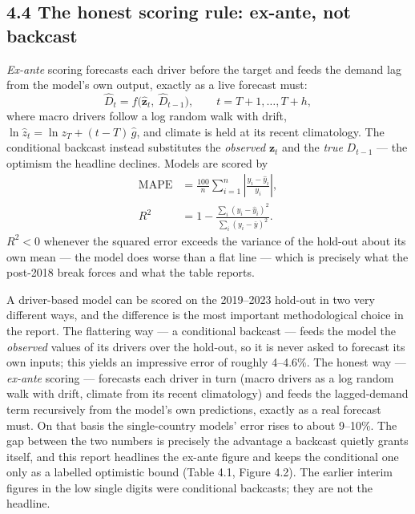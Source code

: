 \documentclass[10pt,twocolumn]{article}
\begin{document}
\subsection*{4.4 The honest scoring rule: ex-ante, not backcast}

\noindent \emph{Ex-ante} scoring forecasts each driver before the target and
feeds the demand lag from the model's own output, exactly as a live forecast
must:
\begin{equation}
\hat D_t=f\!\bigl(\hat{\mathbf{z}}_t,\ \hat D_{t-1}\bigr),\qquad t=T{+}1,\dots,T{+}h,
\label{eq:exante}
\end{equation}
where macro drivers follow a log random walk with drift,
$\ln\hat z_{t}=\ln z_{T}+(t-T)\,\hat g$, and climate is held at its recent
climatology. The conditional backcast instead substitutes the \emph{observed}
$\mathbf{z}_t$ and the \emph{true} $D_{t-1}$ --- the optimism the headline
declines. Models are scored by
\begin{equation}
\begin{aligned}
\mathrm{MAPE}&=\frac{100}{n}\sum_{i=1}^{n}\left|\frac{y_i-\hat y_i}{y_i}\right|,\\
R^{2}&=1-\frac{\sum_i (y_i-\hat y_i)^2}{\sum_i (y_i-\bar y)^2}.
\end{aligned}
\label{eq:scores}
\end{equation}
$R^{2}<0$ whenever the squared error exceeds the variance of the hold-out about
its own mean --- the model does worse than a flat line --- which is precisely
what the post-2018 break forces and what the table reports.

A driver-based model can be scored on the 2019--2023 hold-out in two very different ways, and the difference is the most important methodological choice in the report. The flattering way --- a conditional backcast --- feeds the model the \textit{observed} values of its drivers over the hold-out, so it is never asked to forecast its own inputs; this yields an impressive error of roughly 4--4.6\%. The honest way --- \textit{ex-ante} scoring --- forecasts each driver in turn (macro drivers as a log random walk with drift, climate from its recent climatology) and feeds the lagged-demand term recursively from the model's own predictions, exactly as a real forecast must. On that basis the single-country models' error rises to about 9--10\%. The gap between the two numbers is precisely the advantage a backcast quietly grants itself, and this report headlines the ex-ante figure and keeps the conditional one only as a labelled optimistic bound (Table 4.1, Figure 4.2). The earlier interim figures in the low single digits were conditional backcasts; they are not the headline.
\end{document}
